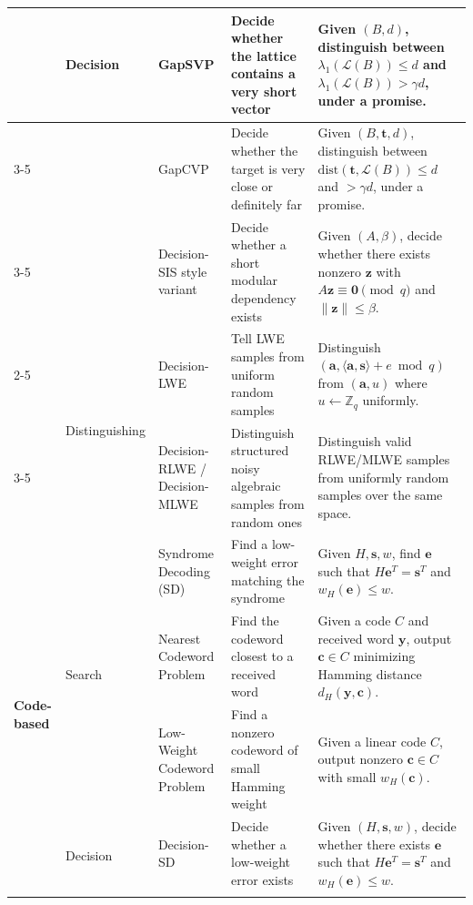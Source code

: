 \documentclass[11pt]{article}
\begin{document}
\begin{center}
\begin{tabular}{|p{2.1cm}|p{1.8cm}|p{3.3cm}|p{3.8cm}|p{4.9cm}|}
			& \multirow{3}{=}{Decision}
			& GapSVP
			& Decide whether the lattice contains a very short vector
			& Given $(B,d)$, distinguish between $\lambda_1(\mathcal{L}(B)) \le d$ and $\lambda_1(\mathcal{L}(B)) > \gamma d$, under a promise. \\
			\cline{3-5}
			
			& & GapCVP
			& Decide whether the target is very close or definitely far
			& Given $(B,\bm t,d)$, distinguish between $\mathrm{dist}(\bm t,\mathcal{L}(B)) \le d$ and $> \gamma d$, under a promise. \\
			\cline{3-5}
			
			& & Decision-SIS style variant
			& Decide whether a short modular dependency exists
			& Given $(A,\beta)$, decide whether there exists nonzero $\bm z$ with $A\bm z \equiv \bm 0 \pmod q$ and $\|\bm z\|\le \beta$. \\
			\cline{2-5}
			
			& \multirow{2}{=}{Distinguishing}
			& Decision-LWE
			& Tell LWE samples from uniform random samples
			& Distinguish $(\bm a,\langle \bm a,\bm s\rangle+e \bmod q)$ from $(\bm a,u)$ where $u \leftarrow \mathbb{Z}_q$ uniformly. \\
			\cline{3-5}
			
			& & Decision-RLWE / Decision-MLWE
			& Distinguish structured noisy algebraic samples from random ones
			& Distinguish valid RLWE/MLWE samples from uniformly random samples over the same space. \\
			\hline
			
			\multirow{6}{=}{\textbf{Code-based}}
			& \multirow{3}{=}{Search}
			& Syndrome Decoding (SD)
			& Find a low-weight error matching the syndrome
			& Given $H,\bm s,w$, find $\bm e$ such that $H\bm e^T=\bm s^T$ and $w_H(\bm e)\le w$. \\
			\cline{3-5}
			
			& & Nearest Codeword Problem
			& Find the codeword closest to a received word
			& Given a code $C$ and received word $\bm y$, output $\bm c \in C$ minimizing Hamming distance $d_H(\bm y,\bm c)$. \\
			\cline{3-5}
			
			& & Low-Weight Codeword Problem
			& Find a nonzero codeword of small Hamming weight
			& Given a linear code $C$, output nonzero $\bm c \in C$ with small $w_H(\bm c)$. \\
			\cline{2-5}
			
			& \multirow{2}{=}{Decision}
			& Decision-SD
			& Decide whether a low-weight error exists
			& Given $(H,\bm s,w)$, decide whether there exists $\bm e$ such that $H\bm e^T=\bm s^T$ and $w_H(\bm e)\le w$. \\
			\cline{3-5}
			

\end{tabular}
\end{center}
\end{document}
